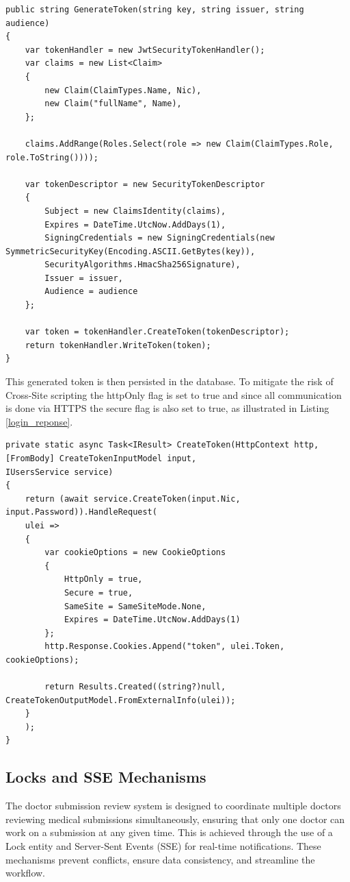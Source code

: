\begin{lstlisting}[style=sharpc, caption={JWT creation}, label={jwt_creation}] 
public string GenerateToken(string key, string issuer, string audience)
{
	var tokenHandler = new JwtSecurityTokenHandler();
	var claims = new List<Claim>
	{
		new Claim(ClaimTypes.Name, Nic),
		new Claim("fullName", Name),
	};
	
	claims.AddRange(Roles.Select(role => new Claim(ClaimTypes.Role, role.ToString())));
	
	var tokenDescriptor = new SecurityTokenDescriptor
	{
		Subject = new ClaimsIdentity(claims),
		Expires = DateTime.UtcNow.AddDays(1),
		SigningCredentials = new SigningCredentials(new SymmetricSecurityKey(Encoding.ASCII.GetBytes(key)),
		SecurityAlgorithms.HmacSha256Signature),
		Issuer = issuer,
		Audience = audience
	};
	
	var token = tokenHandler.CreateToken(tokenDescriptor);
	return tokenHandler.WriteToken(token);
}
\end{lstlisting}

This generated token is then persisted in the database.
To mitigate the risk of Cross-Site scripting the httpOnly flag is set to true and since all communication is done via HTTPS the secure flag is also set to true, as illustrated in Listing \ref{login_reponse}.

\begin{lstlisting}[style=sharpc, caption={Login Reponse, note the HttpOnly and Secure flags are set to true.}, label={login_reponse}] 
private static async Task<IResult> CreateToken(HttpContext http, [FromBody] CreateTokenInputModel input,
IUsersService service)
{
	return (await service.CreateToken(input.Nic, input.Password)).HandleRequest(
	ulei =>
	{
		var cookieOptions = new CookieOptions
		{
			HttpOnly = true,
			Secure = true,
			SameSite = SameSiteMode.None,
			Expires = DateTime.UtcNow.AddDays(1)
		};
		http.Response.Cookies.Append("token", ulei.Token, cookieOptions);
		
		return Results.Created((string?)null, CreateTokenOutputModel.FromExternalInfo(ulei));
	}
	);
}
\end{lstlisting}

\subsection{Locks and SSE Mechanisms}\label{SSE_backend}
The doctor submission review system is designed to coordinate multiple doctors reviewing medical submissions simultaneously, ensuring that only one doctor can work on a submission at any given time. This is achieved through the use of a Lock entity and Server-Sent Events (SSE) for real-time notifications. These mechanisms prevent conflicts, ensure data consistency, and streamline the workflow.

